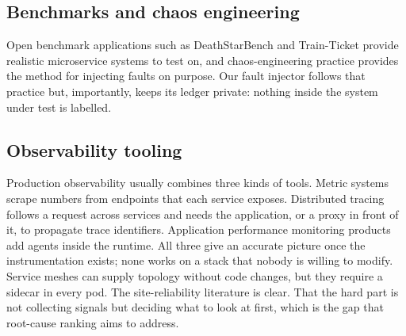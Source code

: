 \subsection{Benchmarks and chaos engineering}
Open benchmark applications such as DeathStarBench \cite{gan2019deathstar} and Train-Ticket \cite{zhou2018trainticket} provide realistic microservice systems to test on, and chaos-engineering practice \cite{basiri2016chaos} provides the method for injecting faults on purpose. Our fault injector follows that practice but, importantly, keeps its ledger private: nothing inside the system under test is labelled.

\subsection{Observability tooling}
Production observability usually combines three kinds of tools. Metric systems scrape numbers from endpoints that each service exposes. Distributed tracing follows a request across services and needs the application, or a proxy in front of it, to propagate trace identifiers. Application performance monitoring products add agents inside the runtime. All three give an accurate picture once the instrumentation exists; none works on a stack that nobody is willing to modify. Service meshes can supply topology without code changes, but they require a sidecar in every pod. The site-reliability literature \cite{beyer2016sre} is clear. That the hard part is not collecting signals but deciding what to look at first, which is the gap that root-cause ranking aims to address.

